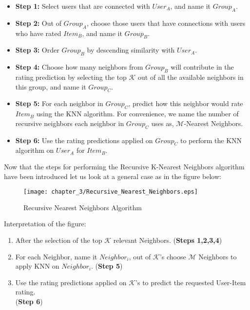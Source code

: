 \begin{itemize}\label{RKNN}
	\item[] \textbf{Step 1:} Select users that are connected with $User_A$, and name it $Group_A$.
	\item[] \textbf{Step 2:} Out of $Group_A$, choose those users that have connections with
	users who have rated $Item_B$, and name it $Group_B$.
	\item[] \textbf{Step 3:}  Order $Group_B$ by descending similarity with $User_A$.
	\item[] \textbf{Step 4:}  Choose how many neighbors from $Group_B$ will contribute in the
	rating prediction by selecting the top $\mathcal{K}$ out of all the available
	neighbors in this group, and name it $Group_C$.
	\item[] \textbf{Step 5:} For each neighbor in $Group_C$, predict how this neighbor would
	rate $Item_B$ using the KNN algorithm. For convenience, we name the number of recursive
	neighbors each neighbor in $Group_C$ uses as, $\mathcal{M}$-Nearest Neighbors.
	\item[] \textbf{Step 6:} Use the rating predictions applied on $Group_C$ to perform
	the KNN algorithm on $User_A$ for $Item_B$.
\end{itemize}

Now that the steps for performing the Recursive K-Nearest Neighbors algorithm have been
introduced let us look at a general case as in the figure below:\\
\begin{figure}[H]
\centering
\texttt{[image: chapter\_3/Recursive\_Nearest\_Neighbors.eps]}
\caption{Recursive Nearest Neighbors Algorithm}
\label{figure:recursive_algorithm}
\end{figure}
Interpretation of the figure:
\begin{enumerate}
	\item After the selection of the top $\mathcal{K}$ relevant Neighbors.
	(\textbf{Steps 1,2,3,4})
	\item For each Neighbor, name it $Neighbor_i$, out of $\mathcal{K}$'s choose $\mathcal{M}$
	Neighbors to apply KNN on $Neighbor_i$. (\textbf{Step 5})
	\item Use the rating predictions applied on $\mathcal{K}$'s to predict the requested
	User-Item rating.\\ (\textbf{Step 6})
\end{enumerate}
